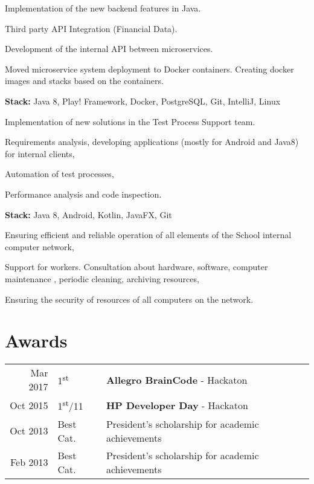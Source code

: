 \begin{tightemize}
\item Implementation of the new backend features in Java.
\item Third party API Integration (Financial Data).
\item Development of the internal API between microservices.
\item Moved microservice system deployment to Docker containers. Creating docker images and stacks based on the containers.
\end{tightemize}

\textbf{Stack:} Java 8, Play! Framework, Docker, PostgreSQL, Git, IntelliJ, Linux
\sectionsep

Implementation of new solutions in the Test Process Support team.
\begin{tightemize}
\item Requirements analysis, developing applications (mostly for Android and Java8) for internal clients, 
\item Automation of test processes,
\item Performance analysis and code inspection.
\end{tightemize}
\textbf{Stack:} Java 8, Android, Kotlin, JavaFX, Git
\sectionsep

\begin{tightemize}
\item Ensuring efficient and reliable operation of all elements of the School internal computer network,
\item Support for workers. Consultation about hardware, software, computer maintenance , periodic cleaning, archiving resources, 
\item Ensuring the security of resources of all computers on the network.
\end{tightemize}
\sectionsep


 \section{Awards} 
 \begin{tabular}{rll}
 Mar 2017	     & 1\textsuperscript{st}     & \textbf{Allegro BrainCode} - Hackaton \\
 Oct 2015	     & 1\textsuperscript{st}/11  & \textbf{HP Developer Day}  - Hackaton\\
 Oct 2013      & Best Cat.  & President’s scholarship for academic achievements \\
 Feb 2013      & Best Cat.  & President’s scholarship for academic achievements \\
 \end{tabular}
 \sectionsep